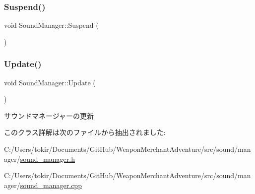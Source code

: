 \mbox{\label{class_sound_manager_a97d76cb22596fbb3c85766df0dcde757}} 
\subsubsection{\texorpdfstring{Suspend()}{Suspend()}}
{\footnotesize\ttfamily void Sound\+Manager\+::\+Suspend (\begin{DoxyParamCaption}{ }\end{DoxyParamCaption})\hspace{0.3cm}{\ttfamily [inline]}}

\mbox{\label{class_sound_manager_aaf241621221cdbefeba78e8b6bc29240}} 
\subsubsection{\texorpdfstring{Update()}{Update()}}
{\footnotesize\ttfamily void Sound\+Manager\+::\+Update (\begin{DoxyParamCaption}{ }\end{DoxyParamCaption})}



サウンドマネージャーの更新 



このクラス詳解は次のファイルから抽出されました\+:\begin{DoxyCompactItemize}
\item 
C\+:/\+Users/tokir/\+Documents/\+Git\+Hub/\+Weapon\+Merchant\+Adventure/src/sound/manager/\mbox{\hyperlink{sound__manager_8h}{sound\+\_\+manager.\+h}}\item 
C\+:/\+Users/tokir/\+Documents/\+Git\+Hub/\+Weapon\+Merchant\+Adventure/src/sound/manager/\mbox{\hyperlink{sound__manager_8cpp}{sound\+\_\+manager.\+cpp}}\end{DoxyCompactItemize}
